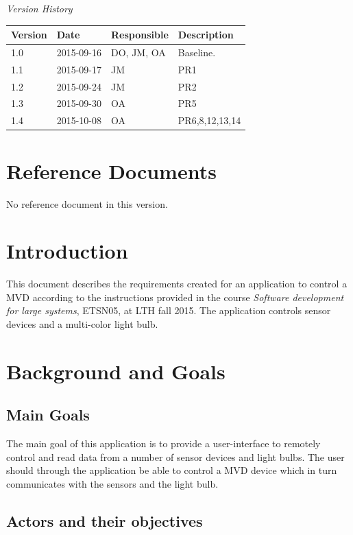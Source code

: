 \documentclass[a4paper]{article}
\begin{document}
\begin{center}
\textit{\large Version History}

    \begin{tabular}{ | l | l | l | p{5cm} |}
    \hline
    \textbf{Version} 	& \textbf{Date} 	& \textbf{Responsible} 	& \textbf{Description} 		\\ \hline
    1.0				 	& 2015-09-16 			& DO, JM, OA			&  Baseline. 				\\ \hline
    1.1				 	& 2015-09-17 			& JM					&  PR1				\\ \hline
    1.2				 	& 2015-09-24 			& JM					&  PR2				\\ \hline
    1.3				 	& 2015-09-30 			& OA					&  PR5				\\ \hline
    1.4				 	& 2015-10-08 			& OA					&  PR6,8,12,13,14				\\ \hline
    \end{tabular}
\end{center}


\tableofcontents
\newpage
{}

\section{Reference Documents}
No reference document in this version.

\section{Introduction}
This document describes the requirements created for an application to control a MVD according to the instructions provided in the course \textit{Software development for large systems}, ETSN05, at LTH fall 2015.  The application controls sensor devices and a multi-color light bulb.

\section{Background and Goals}
\subsection{Main Goals}
The main goal of this application is to provide a user-interface to remotely control and read data from a number of sensor devices and light bulbs. The user should through the application be able to control a MVD device which in turn communicates with the sensors and the light bulb.
\subsection{Actors and their objectives}
\end{document}
